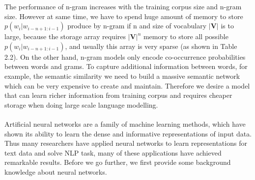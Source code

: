\noindent
The performance of n-gram increases with the training corpus size and n-gram size\cite{jurafsky2000speech,mikolov2012statistical}. 
However at same time, we have to spend huge amount of memory to store $p(w_{i}|w_{i-n+1:i-1})$ produce by n-gram if n and size of vocabulary $|\mathbf{V}|$ is to large, because the storage array requires $|\mathbf{V}|^{n}$ memory to store all possible $p(w_{i}|w_{i-n+1:i-1})$, and usually this array is very sparse (as shown in Table 2.2).
On the other hand, n-gram models only encode co-occurrence probabilities between words and grams. To capture additional information between words, for example, the semantic similarity we need to build a massive semantic network\cite{lehmann1992semantic} which can be very expensive to create and maintain.
Therefore we desire a model that can learn richer information from training corpus and requires cheaper storage when doing large scale language modelling.\\\\
Artificial neural networks are a family of machine learning methods, which have shown its ability to learn the dense and informative representations of input data\cite{bengio2009learning}. 
Thus many researchers have applied neural networks to learn representations for text data and solve NLP task, many of these applications have achieved remarkable results\cite{mikolov2012statistical}.  
Before we go further, we first provide some background knowledge about neural networks.
